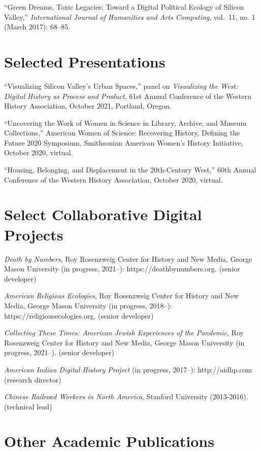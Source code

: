 ``Green Dreams, Toxic Legacies: Toward a Digital Political Ecology of
Silicon Valley,'' \emph{International Journal of Humanities and Arts
Computing}, vol.~11, no. 1 (March 2017): 68--85.

\hypertarget{selected-presentations}{%
\section{Selected Presentations}\label{selected-presentations}}

``Visualizing Silicon Valley's Urban Spaces,'' panel on
\emph{Visualizing the West: Digital History as Process and Product},
61st Annual Conference of the Western History Association, October 2021,
Portland, Oregon.

``Uncovering the Work of Women in Science in Library, Archive, and
Museum Collections,'' American Women of Science: Recovering History,
Defining the Future 2020 Symposium, Smithsonian American Women's History
Initiative, October 2020, virtual.

``Housing, Belonging, and Displacement in the 20th-Century West,'' 60th
Annual Conference of the Western History Association, October 2020,
virtual.

\hypertarget{select-collaborative-digital-projects}{%
\section{Select Collaborative Digital
Projects}\label{select-collaborative-digital-projects}}

\emph{Death by Numbers}, Roy Rosenzweig Center for History and New
Media, George Mason University (in progress, 2021--):
https://deathbynumbers.org. (senior developer)

\emph{American Religious Ecologies}, Roy Rosenzweig Center for History
and New Media, George Mason University (in progress, 2018--):
https://religiousecologies.org. (senior developer)

\emph{Collecting These Times: American Jewish Experiences of the
Pandemic}, Roy Rosenzweig Center for History and New Media, George Mason
University (in progress, 2021--). (senior developer)

\emph{American Indian Digital History Project} (in progress, 2017--):
http://aidhp.com (research director)

\emph{Chinese Railroad Workers in North America}, Stanford University
(2013-2016). (technical lead)

\hypertarget{other-academic-publications}{%
\section{Other Academic
Publications}\label{other-academic-publications}}

